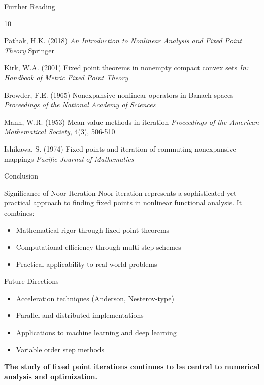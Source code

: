 \documentclass[aspectratio=169,10pt]{beamer}
\begin{document}
\begin{frame}{Further Reading}

\begin{thebibliography}{10}

  Pathak, H.K. (2018)
  \textit{An Introduction to Nonlinear Analysis and Fixed Point Theory}
  Springer

  Kirk, W.A. (2001)
  Fixed point theorems in nonempty compact convex sets
  \textit{In: Handbook of Metric Fixed Point Theory}

  Browder, F.E. (1965)
  Nonexpansive nonlinear operators in Banach spaces
  \textit{Proceedings of the National Academy of Sciences}

  Mann, W.R. (1953)
  Mean value methods in iteration
  \textit{Proceedings of the American Mathematical Society}, 4(3), 506-510

  Ishikawa, S. (1974)
  Fixed points and iteration of commuting nonexpansive mappings
  \textit{Pacific Journal of Mathematics}

\end{thebibliography}

\end{frame}

\begin{frame}{Conclusion}

\begin{block}{Significance of Noor Iteration}
Noor iteration represents a sophisticated yet practical approach to finding fixed points in nonlinear functional analysis. It combines:
\begin{itemize}
  \item Mathematical rigor through fixed point theorems
  \item Computational efficiency through multi-step schemes
  \item Practical applicability to real-world problems
\end{itemize}
\end{block}

\vspace{0.4cm}

\begin{block}{Future Directions}
\begin{itemize}
  \item Acceleration techniques (Anderson, Nesterov-type)
  \item Parallel and distributed implementations
  \item Applications to machine learning and deep learning
  \item Variable order step methods
\end{itemize}
\end{block}

\vspace{0.4cm}

\textbf{The study of fixed point iterations continues to be central to numerical analysis and optimization.}

\end{frame}
\end{document}
